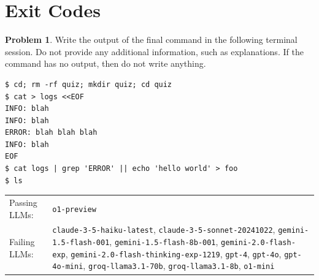 \documentclass[10pt]{article}
\theoremstyle{definition}
\newtheorem{problem}{Problem}
\begin{document}
\noindent\vspace{0.1in}\begin{minipage}{\textwidth}
\section{Exit Codes}

\begin{problem}
Write the output of the final command in the following terminal session.
Do not provide any additional information,
such as explanations.
If the command has no output,
then do not write anything.

\end{problem}
\begin{lstlisting}
$ cd; rm -rf quiz; mkdir quiz; cd quiz
$ cat > logs <<EOF
INFO: blah
INFO: blah
ERROR: blah blah blah
INFO: blah
EOF
$ cat logs | grep 'ERROR' || echo 'hello world' > foo
$ ls
\end{lstlisting}


\noindent
\begin{tabular}{p{1.0in}L{5in}}
Passing LLMs: & {\lstinline$o1-preview$} \\
Failing LLMs: & {\lstinline$claude-3-5-haiku-latest$}, {\lstinline$claude-3-5-sonnet-20241022$}, {\lstinline$gemini-1.5-flash-001$}, {\lstinline$gemini-1.5-flash-8b-001$}, {\lstinline$gemini-2.0-flash-exp$}, {\lstinline$gemini-2.0-flash-thinking-exp-1219$}, {\lstinline$gpt-4$}, {\lstinline$gpt-4o$}, {\lstinline$gpt-4o-mini$}, {\lstinline$groq-llama3.1-70b$}, {\lstinline$groq-llama3.1-8b$}, {\lstinline$o1-mini$} \\
\end{tabular}

\end{minipage}
\end{document}
